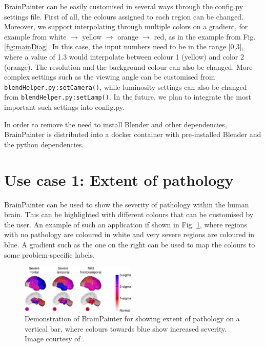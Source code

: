 \documentclass[final,times,twocolumn,authoryear]{elsarticle}
\begin{document}

BrainPainter can be easily customised in several ways through the config.py settings file. First of all, the colours assigned to each region can be changed. Moreover, we support interpolating through multiple colors on a gradient, for example from white $\rightarrow$ yellow $\rightarrow$ orange $\rightarrow$ red, as in the example from Fig. \ref{fig:mainDiag}. In this case, the input numbers need to be in the range [0,3], where a value of 1.3 would interpolate between colour 1 (yellow) and color 2 (orange). The resolution and the background colour can also be changed. More complex settings such as the viewing angle can be customised from \verb|blendHelper.py:setCamera()|, while luminosity settings can also be changed from \verb|blendHelper.py:setLamp()|. In the future, we plan to integrate the most important such settings into config.py. 

In order to remove the need to install Blender and other dependencies, BrainPainter is distributed into a docker container with pre-installed Blender and the python dependencies. 


\section{Use case 1: Extent of pathology}
\label{extent}

BrainPainter can be used to show the severity of pathology within the human brain. This can be highlighted with different colours that can be customised by the user. An example of such an application if shown in Fig. \ref{fig:youngExtent}, where regions with no pathology are coloured in white and very severe regions are coloured in blue. A gradient such as the one on the right can be used to map the colours to some problem-specific labels.



\begin{figure}
 \includegraphics[width=0.49\textwidth]{images/young_3brains.png}
 \caption{Demonstration of BrainPainter for showing extent of pathology on a vertical bar, where colours towards blue show increased severity. Image courtesy of \cite{young2018uncovering}.}
 \label{fig:youngExtent}
\end{figure}
\end{document}
